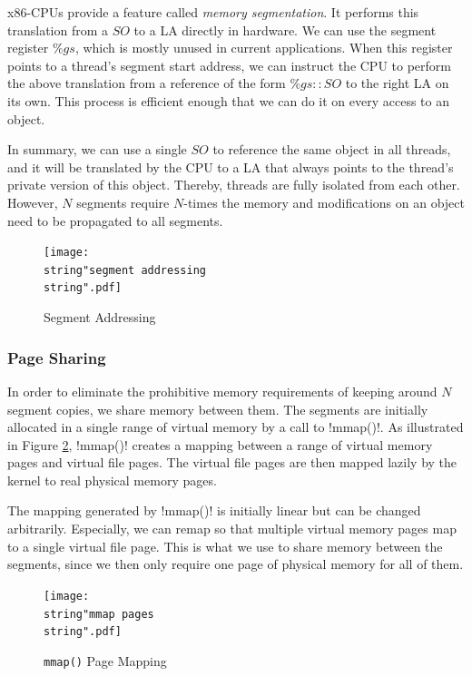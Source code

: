 \documentclass{sigplanconf}
\makeatletter
\renewcommand\lstinline[1][]{%
  \Collectverb{\@@myverb}%
}
\def\@@myverb#1{%
    \begingroup
    \fboxsep=0.2em
    \colorbox{verylightgray}{\oldlstinline|#1|}%
    \endgroup
}
\makeatother
\begin{document}
x86-CPUs provide a feature called \emph{memory segmentation}. It
performs this translation from a $SO$ to a LA directly in hardware.  We
can use the segment register $\%gs$, which is mostly unused in current
applications. When this register points to a thread's segment start
address, we can instruct the CPU to perform the above translation from
a reference of the form $\%gs{::}SO$ to the right LA on its own. This
process is efficient enough that we can do it on every access to an
object.

In summary, we can use a single $SO$ to reference the same object in all
threads, and it will be translated by the CPU to a LA that always
points to the thread's private version of this object. Thereby,
threads are fully isolated from each other. However, $N$ segments
require $N$-times the memory and modifications on an object need to be
propagated to all segments.

\begin{figure}[t]
  \centering
  \texttt{[image: \\string"segment addressing\\string".pdf]}
  \caption{Segment Addressing\label{fig:Segment-Addressing}}
\end{figure}



\subsubsection{Page Sharing}

In order to eliminate the prohibitive memory requirements of keeping
around $N$ segment copies, we share memory between them. The segments
are initially allocated in a single range of virtual memory by a call
to \lstinline!mmap()!.  As illustrated in Figure
\ref{fig:mmap()-Page-Mapping}, \lstinline!mmap()! creates a mapping
between a range of virtual memory pages and virtual file pages. The
virtual file pages are then mapped lazily by the kernel to real
physical memory pages.

The mapping generated by \lstinline!mmap()! is initially linear but
can be changed arbitrarily. Especially, we can remap so that multiple
virtual memory pages map to a single virtual file page. This is what
we use to share memory between the segments, since we then only
require one page of physical memory for all of them.

\begin{figure}[h]
  \centering
  \texttt{[image: \\string"mmap pages\\string".pdf]}
  \caption{\texttt{mmap()} Page Mapping\label{fig:mmap()-Page-Mapping}}
\end{figure}
\end{document}
